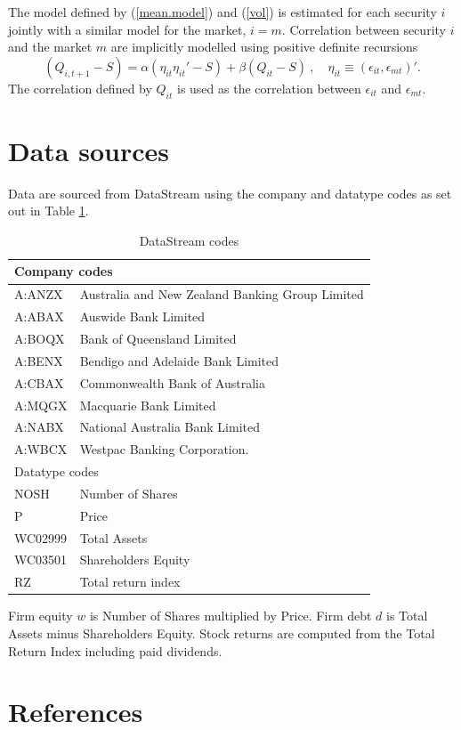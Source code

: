 \documentclass[authoryear]{elsarticle}
\newcommand{\eps}{\epsilon}
\newcommand{\cq}{\ ,\quad }
\newcommand{\eref}[1]{(\ref{#1})}
\newcommand{\tref}[1]{Table \ref{#1}}
\begin{document}
The model defined by \eref{mean.model} and \eref{vol} is estimated  for each security $i$ jointly with  a similar model for  the market,  $i=m$.   Correlation between security $i$ and the market $m$ are implicitly modelled using  positive definite recursions   \citep{engle2002dynamic}
$$
(Q_{i,t+1}-S) = \alpha (\eta_{it}\eta_{it}'-S) + \beta (Q_{it}-S)\cq \eta_{it}\equiv(\eps_{it},\eps_{mt})' .
$$
The correlation defined by $Q_{it}$ is used as the correlation between $\eps_{it}$ and $\eps_{mt}$.


\section{Data sources}\label{data}

Data are sourced from DataStream using the company and datatype codes as set out in \tref{datastream}.

\begin{table}\caption{DataStream codes}\label{datastream}
\begin{center}
	\begin{tabular}{l|l}
	\hline
	\multicolumn{2}{l}{Company codes}\\
	\hline
A:ANZX & Australia and New Zealand Banking Group Limited\\
A:ABAX & Auswide Bank Limited\\
A:BOQX & Bank of Queensland Limited\\
A:BENX & Bendigo and Adelaide Bank Limited\\
A:CBAX & Commonwealth Bank of Australia\\
A:MQGX & Macquarie Bank Limited\\
A:NABX & National Australia Bank Limited\\
A:WBCX & Westpac Banking Corporation.\\
\hline
\multicolumn{2}{l}{Datatype codes}\\
\hline
	NOSH & Number of Shares\\
	P & Price\\
	WC02999 & Total Assets\\
	WC03501 & Shareholders Equity\\
	RZ & Total return index\\
\hline	
\end{tabular}
\end{center}
\end{table}

Firm equity $w$ is Number of Shares multiplied by Price. Firm debt $d$ is Total Assets minus Shareholders Equity. Stock returns are computed from the Total Return Index including paid dividends.

\newpage
\section{References}

\end{document}
